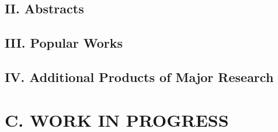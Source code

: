 \documentclass{res}
\newcommand{\MarginText}[1]{\section{#1}\vspace{10pt}}
\begin{document}
\begin{resume}
  \subsection{II. Abstracts}
  \subsection{III. Popular Works}
  \subsection{IV. Additional Products of Major Research}
  \nocite{*}
  \vspace{10pt}
  \printbibliography[heading=none]

  \MarginText{C. WORK IN PROGRESS}
  \vspace{10pt}
  \nocite{*}
  \vspace{10pt}
  \printbibliography[heading=none]
  \clearpage

\end{resume}
\end{document}
